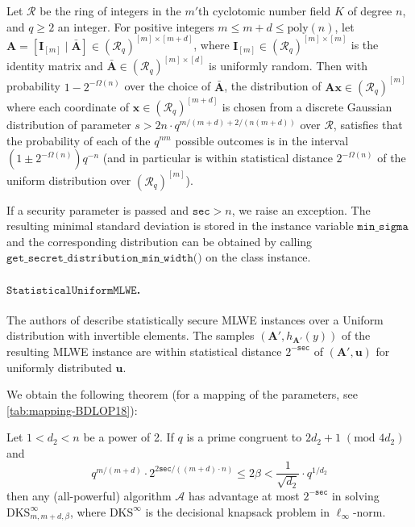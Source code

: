 \begin{theorem}
    Let $\mathcal{R}$ be the ring of integers in the $m'$th cyclotomic number field $K$ of degree $n$, and $q \geq 2$ an integer.
    For positive integers $m \leq m + d \leq \text{poly}(n)$, let $\mathbf{A} = [ \mathbf{I}_{[m]} \mid \bar{\mathbf{A}}] \in (\mathcal{R}_q)^{[m] \times [m+d]}$, where $\mathbf{I}_{[m]} \in (\mathcal{R}_q)^{[m] \times [m]}$ is the identity matrix and $\bar{\mathbf{A}} \in (\mathcal{R}_q)^{[m] \times [d]}$ is uniformly random.
    Then with probability $1 - 2^{-\Omega(n)}$ over the choice of $\bar{\mathbf{A}}$, the distribution of $\mathbf{A}\mathbf{x} \in (\mathcal{R}_q)^{[m]}$ where each coordinate of $\mathbf{x} \in (\mathcal{R}_q)^{[m+d]}$ is chosen from a discrete Gaussian distribution of parameter $s > 2n \cdot q^{m / (m+d) + 2/(n (m+d))}$ over $\mathcal{R}$, satisfies that the probability of each of the $q^{n m}$ possible outcomes is in the interval $(1 \pm 2^{-\Omega(n)}) q^{-n }$ (and in particular is within statistical distance $2^{-\Omega(n)}$ of the uniform distribution over $(\mathcal{R}_q)^{[m]}$). %
\end{theorem}

If a security parameter is passed and $\texttt{sec} > n$, we raise an exception.
The resulting minimal standard deviation is stored in the instance variable $\texttt{min\_sigma}$ and the corresponding distribution can be obtained by calling $\texttt{get\_secret\_distribution\_min\_width()}$ on the class instance.



\paragraph{$\texttt{StatisticalUniformMLWE}$.} The authors of \cite{BDLOP18} describe statistically secure MLWE instances over a Uniform distribution with invertible elements. The samples $(\mathbf{A}', h_{\mathbf{A}'}(y))$ of the resulting MLWE instance are within statistical distance $2^{-\texttt{sec}}$ of $(\mathbf{A}', \mathbf{u})$ for uniformly distributed $\mathbf{u}$. %

We obtain the following theorem (for a mapping of the parameters, see \cref{tab:mapping-BDLOP18}): %

\begin{theorem}
    Let $1 < d_2 < n$ be a power of 2. If $q$ is a prime congruent to $2d_2 + 1 \;(\text{mod } 4d_2)$ and
    \begin{equation}
        q^{m/(m+d)} \cdot 2^{2 \texttt{sec}/((m+d)\cdot n)} \leq 2 \beta < \frac{1}{\sqrt{d_2}} \cdot q^{1/d_2}
    \end{equation}
    then any (all-powerful) algorithm $\mathcal{A}$ has advantage at most $2^{-\texttt{sec}}$ in solving $\text{DKS}_{m,m+d,\beta}^\infty$, where $\text{DKS}^\infty$ is the decisional knapsack problem in $\ell_\infty$-norm.
\end{theorem}


